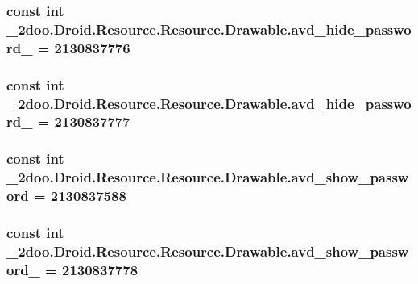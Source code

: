\hypertarget{class__2doo_1_1_droid_1_1_resource_1_1_drawable_b41fd6d19f1c8656ec629e70ef8c813f}{
\subsubsection[{avd\_\-hide\_\-password\_\-2}]{\setlength{\rightskip}{0pt plus 5cm}const int \_\-2doo.Droid.Resource.Resource.Drawable.avd\_\-hide\_\-password\_ = 2130837776}}
\label{class__2doo_1_1_droid_1_1_resource_1_1_drawable_b41fd6d19f1c8656ec629e70ef8c813f}


\hypertarget{class__2doo_1_1_droid_1_1_resource_1_1_drawable_9504a51ec6003e581bf64de3fc0618a6}{
\subsubsection[{avd\_\-hide\_\-password\_\-3}]{\setlength{\rightskip}{0pt plus 5cm}const int \_\-2doo.Droid.Resource.Resource.Drawable.avd\_\-hide\_\-password\_ = 2130837777}}
\label{class__2doo_1_1_droid_1_1_resource_1_1_drawable_9504a51ec6003e581bf64de3fc0618a6}


\hypertarget{class__2doo_1_1_droid_1_1_resource_1_1_drawable_86e27fae92fdff2227c45e2bb72f8dbe}{
\subsubsection[{avd\_\-show\_\-password}]{\setlength{\rightskip}{0pt plus 5cm}const int \_\-2doo.Droid.Resource.Resource.Drawable.avd\_\-show\_\-password = 2130837588}}
\label{class__2doo_1_1_droid_1_1_resource_1_1_drawable_86e27fae92fdff2227c45e2bb72f8dbe}


\hypertarget{class__2doo_1_1_droid_1_1_resource_1_1_drawable_8761f957b176981c316cb46412849700}{
\subsubsection[{avd\_\-show\_\-password\_\-1}]{\setlength{\rightskip}{0pt plus 5cm}const int \_\-2doo.Droid.Resource.Resource.Drawable.avd\_\-show\_\-password\_ = 2130837778}}
\label{class__2doo_1_1_droid_1_1_resource_1_1_drawable_8761f957b176981c316cb46412849700}


